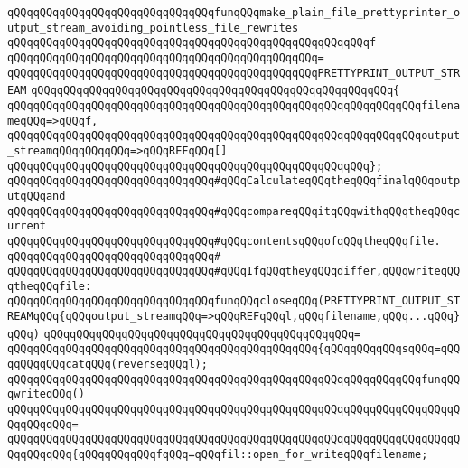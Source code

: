 \newline
\verb|qQQqqQQqqQQqqQQqqQQqqQQqqQQqqQQqfunqQQqmake_plain_file_prettyprinter_output_stream_avoiding_pointless_file_rewrites|\newline
\verb|qQQqqQQqqQQqqQQqqQQqqQQqqQQqqQQqqQQqqQQqqQQqqQQqqQQqqQQqf|\newline
\verb|qQQqqQQqqQQqqQQqqQQqqQQqqQQqqQQqqQQqqQQqqQQqqQQq=|\newline
\verb|qQQqqQQqqQQqqQQqqQQqqQQqqQQqqQQqqQQqqQQqqQQqqQQqPRETTYPRINT_OUTPUT_STREAM|\newline
\verb|qQQqqQQqqQQqqQQqqQQqqQQqqQQqqQQqqQQqqQQqqQQqqQQqqQQqqQQq{|\newline
\verb|qQQqqQQqqQQqqQQqqQQqqQQqqQQqqQQqqQQqqQQqqQQqqQQqqQQqqQQqqQQqqQQqfilenameqQQq=>qQQqf,|\newline
\verb|qQQqqQQqqQQqqQQqqQQqqQQqqQQqqQQqqQQqqQQqqQQqqQQqqQQqqQQqqQQqqQQqoutput_streamqQQqqQQqqQQq=>qQQqREFqQQq[]|\newline
\verb|qQQqqQQqqQQqqQQqqQQqqQQqqQQqqQQqqQQqqQQqqQQqqQQqqQQqqQQq};|\newline
\newline
\verb|qQQqqQQqqQQqqQQqqQQqqQQqqQQqqQQq#qQQqCalculateqQQqtheqQQqfinalqQQqoutputqQQqand|\newline
\verb|qQQqqQQqqQQqqQQqqQQqqQQqqQQqqQQq#qQQqcompareqQQqitqQQqwithqQQqtheqQQqcurrent|\newline
\verb|qQQqqQQqqQQqqQQqqQQqqQQqqQQqqQQq#qQQqcontentsqQQqofqQQqtheqQQqfile.|\newline
\verb|qQQqqQQqqQQqqQQqqQQqqQQqqQQqqQQq#|\newline
\verb|qQQqqQQqqQQqqQQqqQQqqQQqqQQqqQQq#qQQqIfqQQqtheyqQQqdiffer,qQQqwriteqQQqtheqQQqfile:|\newline
\newline
\verb|qQQqqQQqqQQqqQQqqQQqqQQqqQQqqQQqfunqQQqcloseqQQq(PRETTYPRINT_OUTPUT_STREAMqQQq{qQQqoutput_streamqQQq=>qQQqREFqQQql,qQQqfilename,qQQq...qQQq}qQQq)|\newline
\verb|qQQqqQQqqQQqqQQqqQQqqQQqqQQqqQQqqQQqqQQqqQQqqQQq=|\newline
\verb|qQQqqQQqqQQqqQQqqQQqqQQqqQQqqQQqqQQqqQQqqQQqqQQq{qQQqqQQqqQQqsqQQq=qQQqqQQqqQQqcatqQQq(reverseqQQql);|\newline
\newline
\verb|qQQqqQQqqQQqqQQqqQQqqQQqqQQqqQQqqQQqqQQqqQQqqQQqqQQqqQQqqQQqqQQqfunqQQqwriteqQQq()|\newline
\verb|qQQqqQQqqQQqqQQqqQQqqQQqqQQqqQQqqQQqqQQqqQQqqQQqqQQqqQQqqQQqqQQqqQQqqQQqqQQqqQQq=|\newline
\verb|qQQqqQQqqQQqqQQqqQQqqQQqqQQqqQQqqQQqqQQqqQQqqQQqqQQqqQQqqQQqqQQqqQQqqQQqqQQqqQQq{qQQqqQQqqQQqfqQQq=qQQqfil::open_for_writeqQQqfilename;|\newline
